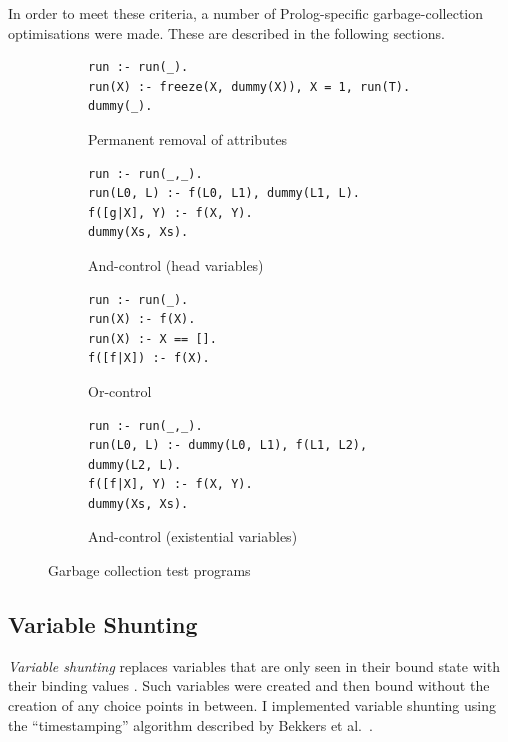 In order to meet these criteria, a number of Prolog-specific garbage-collection optimisations were made. These are described in the following sections.

\begin{figure}[H]
\centering
\begin{subfigure}{\textwidth}
\centering
\begin{verbatim}
run :- run(_).
run(X) :- freeze(X, dummy(X)), X = 1, run(T).
dummy(_).
\end{verbatim}
\caption{Permanent removal of attributes}
\end{subfigure}
\par\bigskip
\par\bigskip
\begin{subfigure}{.65\textwidth}
\centering
\begin{verbatim}
run :- run(_,_).
run(L0, L) :- f(L0, L1), dummy(L1, L).
f([g|X], Y) :- f(X, Y).
dummy(Xs, Xs).
\end{verbatim}
\caption{And-control (head variables)}
\end{subfigure}%
\begin{subfigure}{.35\textwidth}
\centering
\begin{verbatim}
run :- run(_).
run(X) :- f(X).
run(X) :- X == [].
f([f|X]) :- f(X).
\end{verbatim}
\caption{Or-control}
\label{fig:or-control}
\end{subfigure}
\par\bigskip
\par\bigskip
\begin{subfigure}{\textwidth}
\centering
\begin{verbatim}
run :- run(_,_).
run(L0, L) :- dummy(L0, L1), f(L1, L2), dummy(L2, L).
f([f|X], Y) :- f(X, Y).
dummy(Xs, Xs).
\end{verbatim}
\caption{And-control (existential variables)}
\end{subfigure}
\caption{Garbage collection test programs}
\label{fig:gc-programs}
\end{figure}

\subsection{Variable Shunting}

\label{sec:variable-shunting}

\emph{Variable shunting} replaces variables that are only seen in their bound state with their binding values \cite{sahlinVariableShuntingWAM1991}. Such variables were created and then bound without the creation of any choice points in between. I implemented variable shunting using the ``timestamping'' algorithm described by Bekkers et al.\ \cite{bekkersDynamicMemoryManagement1992}.

